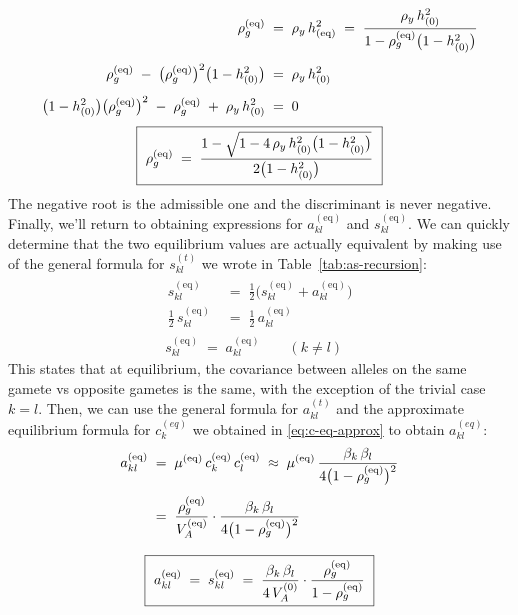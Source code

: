 \documentclass[12pt]{article}
\begin{document}
\begin{equation}\label{eq:rhog-quadratic}
\begin{aligned}
    \rho_g^{(\mathrm{eq})} \;&=\; \rho_y\,h^2_{(\mathrm{eq})} \;=\; \frac{\rho_y\,h^2_{(0)}}{1 - \rho_g^{(\mathrm{eq})}\big(1-h^2_{(0)}\big)} \\[4pt]
    \rho_g^{(\mathrm{eq})} \;-\; \big(\rho_g^{(\mathrm{eq})}\big)^2\big(1-h^2_{(0)}\big) \;&=\; \rho_y\,h^2_{(0)} \\[4pt]
    \big(1 - h^2_{(0)}\big)\big(\rho_g^{(\mathrm{eq})}\big)^2 \;-\; \rho_g^{(\mathrm{eq})} \;+\; \rho_y\,h^2_{(0)} \;&=\; 0
\end{aligned}
\end{equation}
\begin{equation}\label{eq:rhog-eq}
    \boxed{\ \rho_g^{(\mathrm{eq})} \;=\; \frac{1 - \sqrt{1 - 4\,\rho_y\,h^2_{(0)}\big(1-h^2_{(0)}\big)}}{2\big(1-h^2_{(0)}\big)} \ }
\end{equation}
The negative root is the admissible one and the discriminant is never negative.
Finally, we'll return to obtaining expressions for $a_{kl}^{(\mathrm{eq})}$ and $s_{kl}^{(\mathrm{eq})}$.
We can quickly determine that the two equilibrium values are actually equivalent by making use of the general formula for $s_{kl}^{(t)}$ we wrote in Table~\ref{tab:as-recursion}:
\begin{equation}\label{eq:s-eq}
\begin{gathered}
\begin{aligned}
    s^{(\mathrm{eq})}_{kl} \;&=\; \tfrac12\big(s^{(\mathrm{eq})}_{kl} + a^{(\mathrm{eq})}_{kl}\big) \\[4pt]
    \tfrac12\,s^{(\mathrm{eq})}_{kl} \;&=\; \tfrac12\,a^{(\mathrm{eq})}_{kl}
\end{aligned} \\[8pt]
    \boxed{\ s^{(\mathrm{eq})}_{kl} \;=\; a^{(\mathrm{eq})}_{kl} \qquad (k \neq l) \ }
\end{gathered}
\end{equation}
This states that at equilibrium, the covariance between alleles on the same gamete vs opposite gametes is the same, with the exception of the trivial case $k=l$.
Then, we can use the general formula for $a_{kl}^{(t)}$ and the approximate equilibrium formula for $c_k^{(eq)}$ we obtained in \eqref{eq:c-eq-approx} to obtain $a_{kl}^{(eq)}$:
\begin{equation}\label{eq:a-eq}
\begin{gathered}
\begin{aligned}
    a^{(\mathrm{eq})}_{kl} \;&=\; \mu^{(\mathrm{eq})}\, c^{(\mathrm{eq})}_k\, c^{(\mathrm{eq})}_l
    \;\approx\; \mu^{(\mathrm{eq})}\,\frac{\beta_k\,\beta_l}{4\big(1-\rho_g^{(\mathrm{eq})}\big)^2} \\[4pt]
    \;&=\; \frac{\rho_g^{(\mathrm{eq})}}{V_A^{(\mathrm{eq})}} \cdot \frac{\beta_k\,\beta_l}{4\big(1-\rho_g^{(\mathrm{eq})}\big)^2}
\end{aligned} \\[8pt]
    \boxed{\ a^{(\mathrm{eq})}_{kl} \;=\; s^{(\mathrm{eq})}_{kl} \;=\; \frac{\beta_k\,\beta_l}{4\,V_A^{(0)}} \cdot \frac{\rho_g^{(\mathrm{eq})}}{1-\rho_g^{(\mathrm{eq})}} \ }
\end{gathered}
\end{equation}
\end{document}
